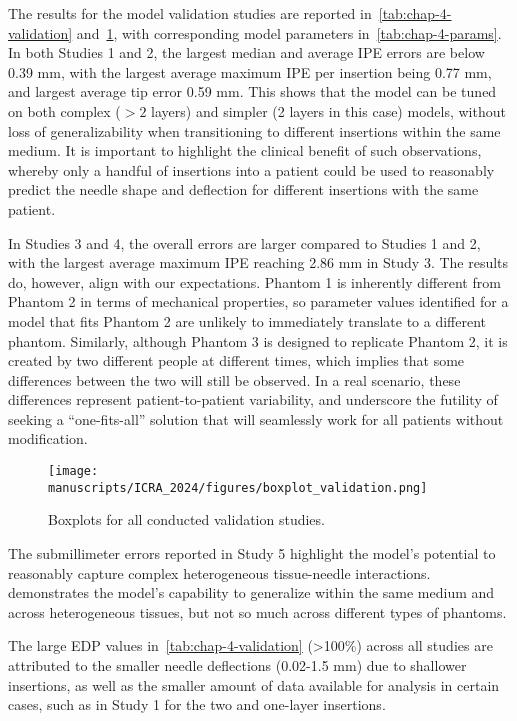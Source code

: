 The results for the model validation studies are reported in~\cref{tab:chap-4-validation} and~\cref{fig:chap-4-valid}, with corresponding model parameters in~\cref{tab:chap-4-params}. In both Studies 1 and 2, the largest median and average IPE errors are below 0.39 mm, with the largest average maximum IPE per insertion being 0.77 mm, and largest average tip error 0.59 mm. This shows that the model can be tuned on both complex ($>2$ layers) and simpler (2 layers in this case) models, without loss of generalizability when transitioning to different insertions within the same medium. It is important to highlight the clinical benefit of such observations, whereby only a handful of insertions into a patient could be used to reasonably predict the needle shape and deflection for different insertions with the same patient.

In Studies 3 and 4, the overall errors are larger compared to Studies 1 and 2, with the largest average maximum IPE reaching 2.86 mm in Study 3. The results do, however, align with our expectations. Phantom 1 is inherently different from Phantom 2 in terms of mechanical properties, so parameter values identified for a model that fits Phantom 2 are unlikely to immediately translate to a different phantom. Similarly, although Phantom 3 is designed to replicate Phantom 2, it is created by two different people at different times, which implies that some differences between the two will still be observed. In a real scenario, these differences represent patient-to-patient variability, and underscore the futility of seeking a ``one-fits-all'' solution that will seamlessly work for all patients without modification.

\begin{figure}[h]
  \centering
  \texttt{[image: manuscripts/ICRA\_2024/figures/boxplot\_validation.png]}
  \caption{Boxplots for all conducted validation studies.}
  \label{fig:chap-4-valid}
\end{figure}

The submillimeter errors reported in Study 5 highlight the model's potential to reasonably capture complex heterogeneous tissue-needle interactions.  demonstrates the model's capability to generalize within the same medium and across heterogeneous tissues, but not so much across different types of phantoms.

The large EDP values in~\cref{tab:chap-4-validation} (>100\%) across all studies are attributed to the smaller needle deflections (0.02-1.5 mm) due to shallower insertions, as well as the smaller amount of data available for analysis in certain cases, such as in Study 1 for the two and one-layer insertions.

